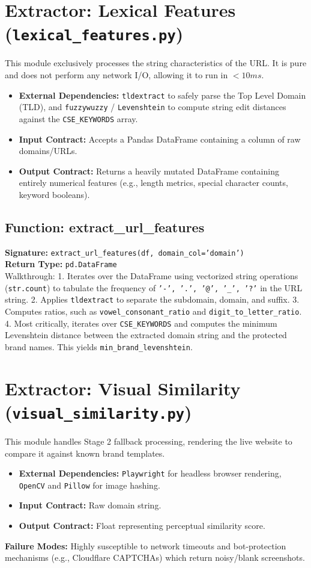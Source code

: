 \documentclass[12pt,a4paper]{report}
\begin{document}
\section{Extractor: Lexical Features (\texttt{lexical\_features.py})}
This module exclusively processes the string characteristics of the URL. It is pure and does not perform any network I/O, allowing it to run in $<10ms$.
\begin{itemize}
\item \textbf{External Dependencies:} \texttt{tldextract} to safely parse the Top Level Domain (TLD), and \texttt{fuzzywuzzy} / \texttt{Levenshtein} to compute string edit distances against the \texttt{CSE\_KEYWORDS} array.
\item \textbf{Input Contract:} Accepts a Pandas DataFrame containing a column of raw domains/URLs.
\item \textbf{Output Contract:} Returns a heavily mutated DataFrame containing entirely numerical features (e.g., length metrics, special character counts, keyword booleans).
\end{itemize}

\subsection{Function: extract\_url\_features}
\textbf{Signature:} \texttt{extract\_url\_features(df, domain\_col='domain')} \\
\textbf{Return Type:} \texttt{pd.DataFrame} \\
Walkthrough:
1. Iterates over the DataFrame using vectorized string operations (\texttt{str.count}) to tabulate the frequency of \texttt{'-', '.', '@', '\_', '?'} in the URL string.
2. Applies \texttt{tldextract} to separate the subdomain, domain, and suffix.
3. Computes ratios, such as \texttt{vowel\_consonant\_ratio} and \texttt{digit\_to\_letter\_ratio}.
4. Most critically, iterates over \texttt{CSE\_KEYWORDS} and computes the minimum Levenshtein distance between the extracted domain string and the protected brand names. This yields \texttt{min\_brand\_levenshtein}.

\section{Extractor: Visual Similarity (\texttt{visual\_similarity.py})}
This module handles Stage 2 fallback processing, rendering the live website to compare it against known brand templates.
\begin{itemize}
\item \textbf{External Dependencies:} \texttt{Playwright} for headless browser rendering, \texttt{OpenCV} and \texttt{Pillow} for image hashing.
\item \textbf{Input Contract:} Raw domain string.
\item \textbf{Output Contract:} Float representing perceptual similarity score.
\end{itemize}
\textbf{Failure Modes:} Highly susceptible to network timeouts and bot-protection mechanisms (e.g., Cloudflare CAPTCHAs) which return noisy/blank screenshots.
\end{document}
